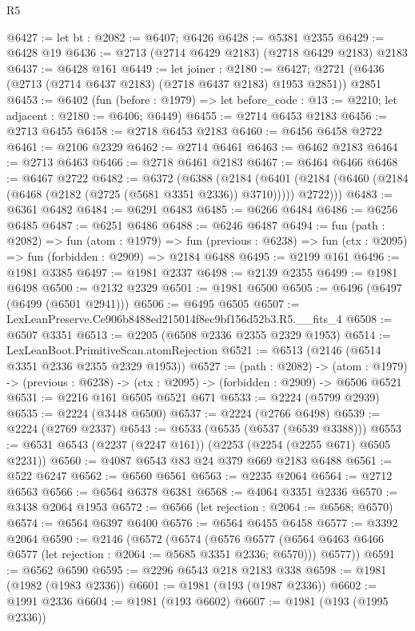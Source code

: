 \begin{lexlean}{R5}
\begin{coremodule}
@6427 := let bt : @2082 := @6407; @6426
@6428 := @5381 @2355
@6429 := @6428 @19
@6436 := @2713 (@2714 @6429 @2183) (@2718 @6429 @2183) @2183
@6437 := @6428 @161
@6449 := let joiner : @2180 := @6427;
  @2721 (@6436 (@2713 (@2714 @6437 @2183) (@2718 @6437 @2183) @1953 @2851)) @2851
@6453 := @6402
    (fun (before : @1979) => let before_code : @13 := @2210; let adjacent : @2180 := @6406; @6449)
@6455 := @2714 @6453 @2183
@6456 := @2713 @6455
@6458 := @2718 @6453 @2183
@6460 := @6456 @6458 @2722
@6461 := @2106 @2329
@6462 := @2714 @6461
@6463 := @6462 @2183
@6464 := @2713 @6463
@6466 := @2718 @6461 @2183
@6467 := @6464 @6466
@6468 := @6467 @2722
@6482 := @6372
    (@6388
      (@2184
        (@6401 (@2184 (@6460 (@2184 (@6468 (@2182 (@2725 (@5681 @3351 @2336)) @3710))))) @2722)))
@6483 := @6361 @6482
@6484 := @6291 @6483
@6485 := @6266 @6484
@6486 := @6256 @6485
@6487 := @6251 @6486
@6488 := @6246 @6487
@6494 := fun (path : @2082) =>
  fun (atom : @1979) =>
  fun (previous : @6238) => fun (ctx : @2095) => fun (forbidden : @2909) => @2184 @6488
@6495 := @2199 @161
@6496 := @1981 @3385
@6497 := @1981 @2337
@6498 := @2139 @2355
@6499 := @1981 @6498
@6500 := @2132 @2329
@6501 := @1981 @6500
@6505 := @6496 (@6497 (@6499 (@6501 @2941)))
@6506 := @6495 @6505
@6507 := LexLeanPreserve.Ce906b8488ed215014f8ec9bf156d52b3.R5.__fits_4
@6508 := @6507 @3351
@6513 := @2205 (@6508 @2336 @2355 @2329 @1953)
@6514 := LexLeanBoot.PrimitiveScan.atomRejection
@6521 := @6513 (@2146 (@6514 @3351 @2336 @2355 @2329 @1953))
@6527 := (path : @2082) ->
  (atom : @1979) -> (previous : @6238) -> (ctx : @2095) -> (forbidden : @2909) -> @6506 @6521
@6531 := @2216 @161 @6505 @6521 @671
@6533 := @2224 (@5799 @2939)
@6535 := @2224 (@3448 @6500)
@6537 := @2224 (@2766 @6498)
@6539 := @2224 (@2769 @2337)
@6543 := @6533 (@6535 (@6537 (@6539 @3388)))
@6553 := @6531 @6543 (@2237 (@2247 @161)) (@2253 (@2254 (@2255 @671) @6505 @2231))
@6560 := @4087 @6543 @83 @24 @379 @669 @2183 @6488
@6561 := @522 @6247
@6562 := @6560 @6561
@6563 := @2235 @2064
@6564 := @2712 @6563
@6566 := @6564 @6378 @6381
@6568 := @4064 @3351 @2336
@6570 := @3438 @2064 @1953
@6572 := @6566 (let rejection : @2064 := @6568; @6570)
@6574 := @6564 @6397 @6400
@6576 := @6564 @6455 @6458
@6577 := @3392 @2064
@6590 := @2146
    (@6572
      (@6574
        (@6576 @6577 (@6564 @6463 @6466 @6577 (let rejection : @2064 := @5685 @3351 @2336; @6570)))
        @6577))
@6591 := @6562 @6590
@6595 := @2296 @6543 @218 @2183 @338
@6598 := @1981 (@1982 (@1983 @2336))
@6601 := @1981 (@193 (@1987 @2336))
@6602 := @1991 @2336
@6604 := @1981 (@193 @6602)
@6607 := @1981 (@193 (@1995 @2336))

\end{coremodule}
\end{lexlean}
